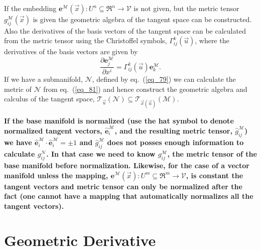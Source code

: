 \documentclass[12pt]{report}
\newcommand{\bm}[1]{\boldsymbol{#1}}
\newcommand{\bfrac}[2]{\displaystyle\frac{#1}{#2}}
\newcommand{\lp}{\left (}
\newcommand{\rp}{\right )}
\newcommand{\pdiff}[2]{\bfrac{\partial {#1}}{\partial {#2}}}
\newcommand{\f}[2]{{#1}\lp {#2} \rp}
\newcommand{\be}{\begin{equation}}
\newcommand{\ee}{\end{equation}}
\newcommand{\Tn}[2]{\f{\mathcal{T}_{#2}}{#1}}
\begin{document}
If the embedding $\f{\bm{e}^{\mathcal{M}}}{\vec{x}}\colon U^{n}\subseteq\Re^{n}\rightarrow \mathcal{V}$ is not given,
but the metric tensor $\f{g_{ij}^{\mathcal{M}}}{\vec{x}}$ is given the geometric algebra of the
tangent space can be constructed.  Also the derivatives of the basis vectors of the tangent space can
be calculated from the metric tensor using the Christoffel symbols, $\f{\Gamma_{ij}^{k}}{\vec{u}}$, where the derivatives of the basis vectors are given by
\be
    \pdiff{\bm{e}_{j}^{\mathcal{M}}}{x^{i}} =\f{\Gamma_{ij}^{k}}{\vec{u}}\bm{e}_{k}^{\mathcal{M}}.
\ee
If we have a submanifold, $\mathcal{N}$, defined by eq.~(\ref{eq_79}) we can calculate the metric of
$\mathcal{N}$ from eq.~(\ref{eq_81}) and hence construct the geometric algebra and calculus of the
tangent space, $\Tn{\mathcal{N}}{\vec{u}}\subseteq \Tn{\mathcal{M}}{\f{\vec{x}}{\vec{u}}}$.

\textbf{If the base manifold is normalized (use the hat symbol to denote normalized tangent vectors,
 $\hat{\bm{e}}_{i}^{\mathcal{M}}$, and the resulting metric tensor, $\hat{g}_{ij}^{\mathcal{M}}$) we have
$\hat{\bm{e}}_{i}^{\mathcal{M}}\cdot\hat{\bm{e}}_{i}^{\mathcal{M}} = \pm 1$ and $\hat{g}_{ij}^{\mathcal{M}}$ does not posses enough
information to calculate $g_{ij}^{\mathcal{N}}$.  In that case we need to know $g_{ij}^{\mathcal{M}}$, the
metric tensor of the base manifold before normalization.  Likewise, for the case of a vector
manifold unless the mapping, $\f{\bm{e}^{\mathcal{M}}}{\vec{x}}\colon U^{m}\subseteq\Re^{m}\rightarrow \mathcal{V}$, is
constant the tangent vectors and metric tensor can only be normalized after the fact (one cannot have a
mapping that automatically normalizes all the tangent vectors).}

\section{Geometric Derivative}
\end{document}
